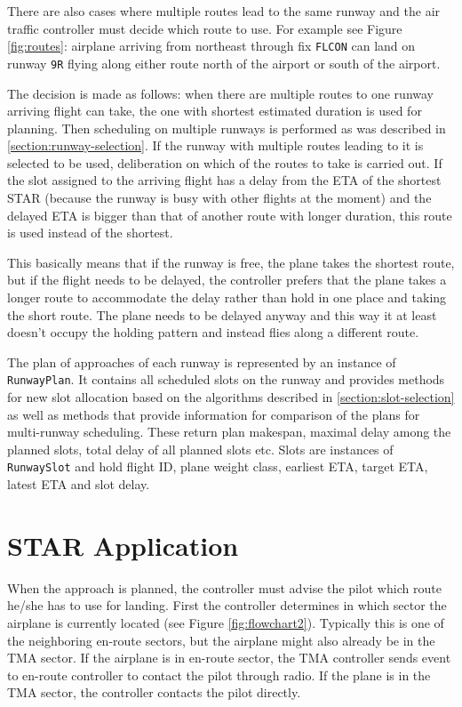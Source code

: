There are also cases where multiple routes lead to the same runway and the air traffic controller must decide which route to use. For example see Figure \ref{fig:routes}: airplane arriving from northeast through fix \texttt{FLCON} can land on runway \texttt{9R} flying along either route north of the airport or south of the airport.

The decision is made as follows: when there are multiple routes to one runway arriving flight can take, the one with shortest estimated duration is used for planning. Then scheduling on multiple runways is performed as was described in \ref{section:runway-selection}. If the runway with multiple routes leading to it is selected to be used, deliberation on which of the routes to take is carried out. If the slot assigned to the arriving flight has a delay from the ETA of the shortest STAR (because the runway is busy with other flights at the moment) and the delayed ETA is bigger than that of another route with longer duration, this route is used instead of the shortest.

This basically means that if the runway is free, the plane takes the shortest route, but if the flight needs to be delayed, the controller prefers that the plane takes a longer route to accommodate the delay rather than hold in one place and taking the short route. The plane needs to be delayed anyway and this way it at least doesn't occupy the holding pattern and instead flies along a different route.

The plan of approaches of each runway is represented by an instance of \texttt{RunwayPlan}. It contains all scheduled slots on the runway and provides methods for new slot allocation based on the algorithms described in \ref{section:slot-selection} as well as methods that provide information for comparison of the plans for multi-runway scheduling. These return plan makespan, maximal delay among the planned slots, total delay of all planned slots etc. Slots are instances of \texttt{RunwaySlot} and hold flight ID, plane weight class, earliest ETA, target ETA, latest ETA and slot delay.


\section{STAR Application}

When the approach is planned, the controller must advise the pilot which route he/she has to use for landing. First the controller determines in which sector the airplane is currently located (see Figure \ref{fig:flowchart2}). Typically this is one of the neighboring en-route sectors, but the airplane might also already be in the TMA sector. If the airplane is in en-route sector, the TMA controller sends event to en-route controller to contact the pilot through radio. If the plane is in the TMA sector, the controller contacts the pilot directly.

